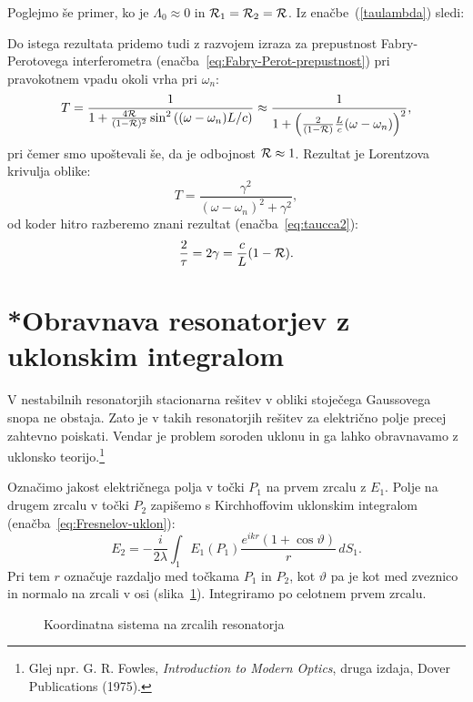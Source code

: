 Poglejmo še primer, ko je $\Lambda_0 \approx 0$ in ${\cal R}_1 = {\cal R}_2 = {\cal R}$.
Iz enačbe~(\ref{taulambda}) sledi:

Do istega rezultata pridemo tudi z razvojem izraza za prepustnost Fabry-Perotovega 
interferometra (enačba~\ref{eq:Fabry-Perot-prepustnost}) pri pravokotnem vpadu  okoli vrha pri $\omega_{n}$:
\begin{equation}
T=\frac{1}{1+\frac{4{\cal R}}{(1-{\cal R})^{2}}\sin^{2}\left((\omega-\omega_{n})L/c\right)}\approx 
\frac{1}{1+\left(\frac{2}{(1-{\cal R})}\frac{L}{c}(\omega-\omega_{n})\right)^{2}},
\label{3.27}
\end{equation}
pri čemer smo upoštevali še, da je odbojnost ${\cal R} \approx 1$. 
Rezultat je Lorentzova krivulja oblike:
 \begin{equation}
 T = \frac{\gamma^2}{(\omega - \omega_n)^2+\gamma^2},
 \label{eq:FBi2}
 \end{equation}
od koder hitro razberemo znani rezultat (enačba~\ref{eq:taucca2}):
\begin{equation}
\frac{2}{\tau}=2\gamma = \frac{c}{L}(1-{\cal R}).
\end{equation}

\section{*Obravnava resonatorjev z uklonskim integralom}
\label{Resonator_uklon}

V nestabilnih resonatorjih stacionarna rešitev v obliki stoječega
Gaussovega snopa ne obstaja. Zato je v takih resonatorjih rešitev za električno polje precej
zahtevno poiskati. Vendar je problem soroden uklonu in ga lahko obravnavamo z 
uklonsko teorijo.\footnote{Glej npr. G. R. Fowles, {\it 
Introduction to Modern Optics}, druga izdaja, Dover Publications (1975).}

Označimo jakost električnega polja v točki $P_{1}$ na prvem zrcalu z $E_{1}$.
Polje na drugem zrcalu v točki $P_2$ zapišemo s Kirchhoffovim uklonskim
integralom (enačba~\ref{eq:Fresnelov-uklon}):
\begin{equation}
E_{2} =  -\frac{i}{2\lambda}\int_{1}E_{1}(P_{1})\frac{e^{ikr}(1+\cos\vartheta)}{r}\, dS_{1}.
\label{eq:resuklon}
\end{equation}
Pri tem $r$ označuje razdaljo med točkama $P_{1}$ in $P_{2}$, kot $\vartheta$ pa je 
kot med zveznico in normalo na zrcali v osi (slika~\ref{fig:uklon_res_shema}).
Integriramo po celotnem prvem zrcalu.  
\begin{figure}[ht]
\centering
\def\svgwidth{90truemm} 

\caption{Koordinatna sistema na zrcalih resonatorja}
\label{fig:uklon_res_shema}
\end{figure}

